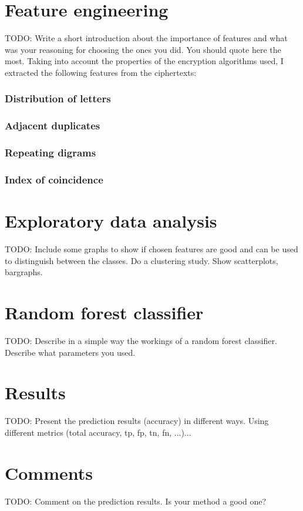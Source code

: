 \documentclass[a4paper]{article}
\begin{document}
\section*{Feature engineering}
TODO: Write a short introduction about the importance of features and what was your reasoning for choosing the ones you did. You should quote here the most.
Taking into account the properties of the encryption algorithms used, I extracted the following features from the ciphertexts:

\subsubsection*{Distribution of letters}
\subsubsection*{Adjacent duplicates}
\subsubsection*{Repeating digrams}
\subsubsection*{Index of coincidence}

\section*{Exploratory data analysis}
TODO: Include some graphs to show if chosen features are good and can be used to distinguish between the classes. Do a clustering study. Show scatterplots, bargraphs.

\section*{Random forest classifier}
TODO: Describe in a simple way the workings of a random forest classifier. Describe what parameters you used.


\section*{Results}
TODO: Present the prediction results (accuracy) in different ways. Using different metrics (total accuracy, tp, fp, tn, fn, ...)...


\section*{Comments}
TODO: Comment on the prediction results. Is your method a good one?



\end{document}
